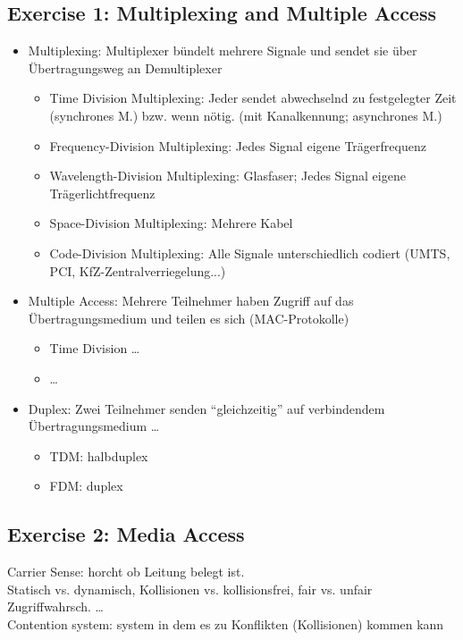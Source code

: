 \documentclass[10pt,a4paper]{scrartcl}
\begin{document}
\subsection*{Exercise 1: Multiplexing and Multiple Access}
\begin{itemize}
\item Multiplexing: Multiplexer bündelt mehrere Signale und sendet sie über Übertragungsweg an Demultiplexer
\begin{itemize}
\item Time Division Multiplexing: Jeder sendet abwechselnd zu festgelegter Zeit (synchrones M.) bzw. wenn nötig. (mit Kanalkennung; asynchrones M.)
\item Frequency-Division Multiplexing: Jedes Signal eigene Trägerfrequenz
\item Wavelength-Division Multiplexing: Glasfaser; Jedes Signal eigene Trägerlichtfrequenz
\item Space-Division Multiplexing: Mehrere Kabel
\item Code-Division Multiplexing: Alle Signale unterschiedlich codiert (UMTS, PCI, KfZ-Zentralverriegelung...)
\end{itemize}
\item Multiple Access: Mehrere Teilnehmer haben Zugriff auf das Übertragungsmedium und teilen es sich (MAC-Protokolle)
\begin{itemize}
\item Time Division \ldots
\item \ldots
\end{itemize}
\item Duplex: Zwei Teilnehmer senden "`gleichzeitig"' auf verbindendem Übertragungsmedium \ldots
\begin{itemize}
\item TDM: halbduplex
\item FDM: duplex
\end{itemize}
\end{itemize}

\subsection*{Exercise 2: Media Access}
Carrier Sense: horcht ob Leitung belegt ist.\\
Statisch vs. dynamisch, Kollisionen vs. kollisionsfrei, fair vs. unfair Zugriffwahrsch. \ldots\\
Contention system: system in dem es zu Konflikten (Kollisionen) kommen kann\\
\end{document}
